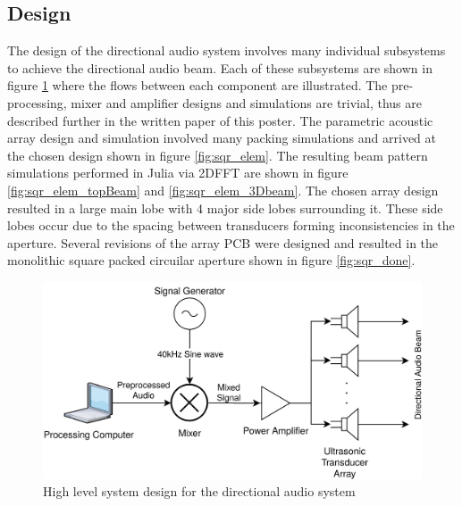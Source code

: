 \documentclass[final,32pt]{beamer}
\begin{document}
\begin{frame}[t]
\begin{multicols}{3}
\section{Design}
The design of the directional audio system involves many individual subsystems to achieve the directional audio beam. Each of these subsystems are shown in figure \ref{fig:highleveldesign} where the flows between each component are illustrated. 
The pre-processing, mixer and amplifier designs and simulations are trivial, thus are described further in the written paper of this poster. The parametric acoustic array design and simulation involved many packing simulations and arrived at the chosen design shown in figure \ref{fig:sqr_elem}. The resulting beam pattern simulations performed in Julia via 2DFFT are shown in figure \ref{fig:sqr_elem_topBeam} and \ref{fig:sqr_elem_3Dbeam}. The chosen array design resulted in a large main lobe with 4 major side lobes surrounding it. These side lobes occur due to the spacing between transducers forming inconsistencies in the aperture. Several revisions of the array PCB were designed and resulted in the monolithic square packed circuilar aperture shown in figure \ref{fig:sqr_done}. 
\begin{figure}[h]
    \centering
    \includegraphics[width=0.8\columnwidth]{Figures/Design/HighlevelSystemDesign (1).png}
    \caption{High level system design for the directional audio system}
    \label{fig:highleveldesign}
\end{figure}
\begin{figure}[h!]
\centering


\end{figure}
\end{multicols}
\end{frame}
\end{document}
